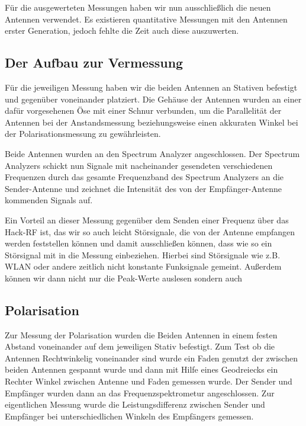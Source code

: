 \documentclass[titlepage,11pt,a4paper,ngerman]{article}
\begin{document}
Für die ausgewerteten Messungen haben wir nun ausschließlich die neuen Antennen verwendet. Es existieren quantitative Messungen mit den Antennen erster Generation, jedoch fehlte die Zeit auch diese auszuwerten.

\subsection{Der Aufbau zur Vermessung}

Für die jeweiligen Messung haben wir die beiden Antennen an Stativen befestigt und gegenüber voneinander platziert. Die Gehäuse der Antennen wurden an einer dafür vorgesehenen Öse mit einer Schnur verbunden, um die Parallelität der Antennen bei der Anstandsmessung beziehungsweise einen akkuraten Winkel bei der Polarisationsmessung zu gewährleisten.\par
Beide Antennen wurden an den Spectrum Analyzer angeschlossen. Der Spectrum Analyzers schickt nun Signale mit nacheinander gesendeten verschiedenen Frequenzen durch das gesamte Frequenzband des Spectrum Analyzers an die Sender-Antenne und zeichnet die Intensität des von der Empfänger-Antenne kommenden Signals auf.\par
Ein Vorteil an dieser Messung gegenüber dem Senden einer Frequenz über das Hack-RF ist, das wir so auch leicht Störsignale, die von der Antenne empfangen werden feststellen können und damit ausschließen können, dass wie so ein Störsignal mit in die Messung einbeziehen. Hierbei sind Störsignale wie z.B. WLAN oder andere zeitlich nicht konstante Funksignale gemeint. Außerdem können wir dann nicht nur die Peak-Werte auslesen sondern auch 

\subsection{Polarisation}
Zur Messung der Polarisation wurden die Beiden Antennen in einem festen Abstand voneinander auf dem jeweiligen Stativ befestigt. Zum Test ob die Antennen Rechtwinkelig voneinander sind wurde ein Faden genutzt der zwischen beiden Antennen gespannt wurde und dann mit Hilfe eines Geodreiecks ein Rechter Winkel zwischen Antenne und Faden gemessen wurde. Der Sender und Empfänger wurden dann an das Frequenzspektrometur angeschlossen. Zur eigentlichen Messung wurde die Leistungsdifferenz zwischen Sender und Empfänger bei unterschiedlichen Winkeln des Empfängers gemessen.




\end{document}
